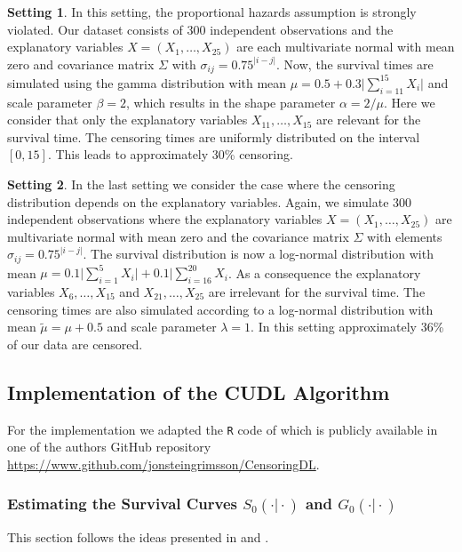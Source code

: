 \documentclass[12pt, a4paper]{scrartcl}
\theoremstyle{definition}
\newtheorem{setting}{Setting}
\theoremstyle{plain}
\numberwithin{equation}{section}
\numberwithin{figure}{section}
\numberwithin{table}{section}
\begin{document}
	\begin{setting}
		In this setting, the proportional hazards assumption is strongly violated.
		Our dataset consists of 300 independent observations and the explanatory variables $X=(X_1,\dots,X_{25})$ are each multivariate normal with mean zero and covariance matrix $\Sigma$ with $\sigma_{ij}=0.75^{\vert i-j\vert}$.
		Now, the survival times are simulated using the gamma distribution with  mean $\mu = 0.5 + 0.3 \vert \sum_{i=11}^{15} X_i \vert$ and scale parameter $\beta = 2$, which results in the shape parameter $\alpha = 2/\mu$.
		Here we consider that only the explanatory variables $X_{11},\dots,X_{15}$ are relevant for the survival time.
		The censoring times are uniformly distributed on the interval $[0,15]$.
		This leads to approximately 30\% censoring.
	\end{setting}

	\begin{setting}
		In the last setting we consider the case where the censoring distribution depends on the explanatory variables.
		Again, we simulate 300 independent observations where the explanatory variables $X=(X_1,\dots,X_{25})$ are multivariate normal with mean zero and the covariance matrix $\Sigma$ with elements $\sigma_{ij}=0.75^{\vert i-j\vert}$.
		The survival distribution is now a log-normal distribution with mean $\mu = 0.1 \vert \sum_{i=1}^5 X_i \vert + 0.1 \vert \sum_{i=16}^{20}X_i$.
		As a consequence the explanatory variables $X_{6},\dots,X_{15}$ and $X_{21},\dots,X_{25}$ are irrelevant for the survival time.
		The censoring times are also simulated according to a log-normal distribution with mean $\tilde{\mu}=\mu+0.5$ and scale parameter $\lambda = 1$.
		In this setting approximately 36\% of our data are censored.
	\end{setting}
			
	\subsection{Implementation of the CUDL Algorithm}\label{impl}
	For the implementation we adapted the \texttt{R} code of \citet*{basearticle} which is publicly available in one of the authors GitHub repository \url{https://www.github.com/jonsteingrimsson/CensoringDL}.
		
	\subsubsection{Estimating the Survival Curves $S_0(\cdot\vert\cdot)$ and $G_0(\cdot\vert\cdot)$}\label{estsurv}
	This section follows the ideas presented in \citet*{drcut} and \citet*{drtrees}.
	
\end{document}
